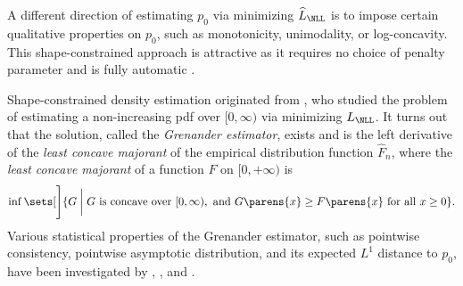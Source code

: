 \documentclass[12pt]{article}
\theoremstyle{definition}
\theoremstyle{theorem}
\theoremstyle{remark}
\begin{document}
A different direction of estimating $p_0$ via minimizing $\widehat{L}_{\NLL}$ is to impose certain qualitative properties on $p_0$, such as monotonicity, unimodality, or log-concavity. This shape-constrained approach is attractive as it requires no choice of penalty parameter and is fully automatic \parencite{Cule2010-lc}. 

Shape-constrained density estimation originated from \textcite{Grenander1956-db}, who studied the problem of estimating a non-increasing pdf over $[0, \infty)$ via minimizing $L_{\NLL}$. It turns out that the solution, called the \textit{Grenander estimator}, exists and is the left derivative of the \textit{least concave majorant} of the empirical distribution function $\widehat{F}_n$, 
where the \textit{least concave majorant} of a function $F$ on $[0, +\infty)$ is 
\begin{align}
	\inf \sets[\Bigg]{G \biggm| G \text{ is concave over } [0, \infty), \text{ and } G \parens{x} \ge F \parens{x} \text{ for all } x \ge 0}. 
\end{align}
Various statistical properties of the Grenander estimator, such as pointwise consistency, pointwise asymptotic distribution, and its expected $L^1$ distance to $p_0$, have been investigated by \textcites{Rao1969-ug}, \textcite{Groeneboom1984-rd}, and \textcite{Birge1989-sr}. 
\end{document}

